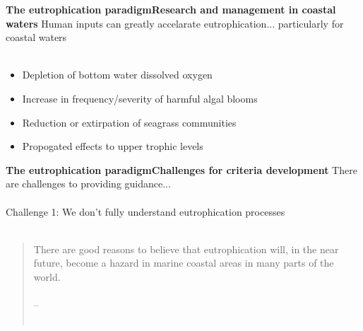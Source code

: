 \documentclass[serif]{beamer}\usepackage[]{graphicx}\usepackage[]{color}
\begin{document}
\begin{frame}{\textbf{The eutrophication paradigm}}{\textbf{Research and management in coastal waters}}
Human inputs can greatly accelarate eutrophication... particularly for coastal waters \\~\\
\begin{itemize}
\item Depletion of bottom water dissolved oxygen \cite{Diaz08}
\item Increase in frequency/severity of harmful algal blooms \cite{Glibert13}
\item Reduction or extirpation of seagrass communities \cite{Tomasko05}
\item Propogated effects to upper trophic levels \cite{Powers05}
\end{itemize}
\end{frame}

\begin{frame}{\textbf{The eutrophication paradigm}}{\textbf{Challenges for criteria development}}
There are challenges to providing guidance...\\~\\
\alert{Challenge 1:} We don't fully understand eutrophication processes \\~\\
\begin{quote}
There are good reasons to believe that eutrophication will, in the near \alert{future}, become a \alert{hazard in marine coastal areas} in many parts of the world.\\~\\
\vspace{0.05in}
\hfill -- \cite{Rosenberg85} \\~\\
\end{quote}
\end{frame}
\end{document}
